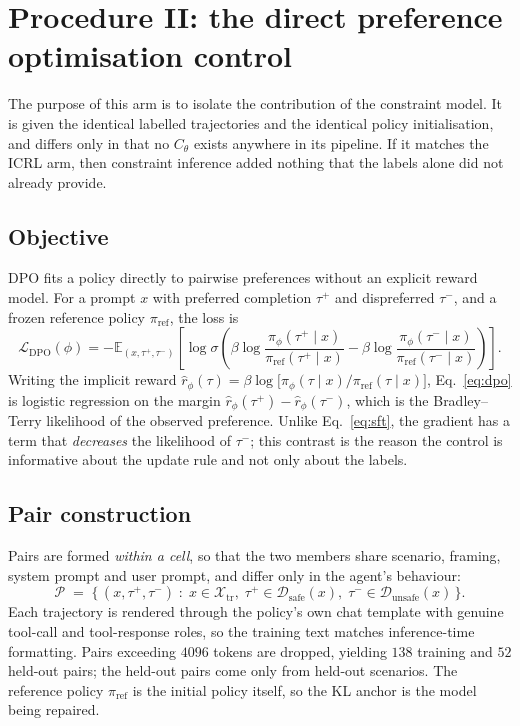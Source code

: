 \documentclass[11pt]{article}
\newcommand{\Cth}{C_{\theta}}
\newcommand{\Ex}{\mathbb{E}}
\begin{document}
\section{Procedure II: the direct preference optimisation control}
\label{sec:dpo}

The purpose of this arm is to isolate the contribution of the constraint model. It is
given the identical labelled trajectories and the identical policy initialisation, and
differs only in that no $\Cth$ exists anywhere in its pipeline. If it matches the ICRL
arm, then constraint inference added nothing that the labels alone did not already
provide.

\subsection{Objective}

DPO fits a policy directly to pairwise preferences without an explicit reward model. For
a prompt $x$ with preferred completion $\tau^{+}$ and dispreferred $\tau^{-}$, and a
frozen reference policy $\pi_{\text{ref}}$, the loss is
\begin{equation}
\mathcal{L}_{\text{DPO}}(\phi)
= - \Ex_{(x, \tau^{+}, \tau^{-})} \left[
\log \sigma \left(
\beta \log \frac{\pi_\phi(\tau^{+} \mid x)}{\pi_{\text{ref}}(\tau^{+} \mid x)}
- \beta \log \frac{\pi_\phi(\tau^{-} \mid x)}{\pi_{\text{ref}}(\tau^{-} \mid x)}
\right) \right].
\label{eq:dpo}
\end{equation}
Writing the implicit reward $\hat{r}_\phi(\tau) = \beta \log \big[ \pi_\phi(\tau \mid x) /
\pi_{\text{ref}}(\tau \mid x) \big]$, Eq.~\eqref{eq:dpo} is logistic regression on the
margin $\hat{r}_\phi(\tau^{+}) - \hat{r}_\phi(\tau^{-})$, which is the Bradley--Terry
likelihood of the observed preference. Unlike Eq.~\eqref{eq:sft}, the gradient has a term
that \emph{decreases} the likelihood of $\tau^{-}$; this contrast is the reason the
control is informative about the update rule and not only about the labels.

\subsection{Pair construction}

Pairs are formed \emph{within a cell}, so that the two members share scenario, framing,
system prompt and user prompt, and differ only in the agent's behaviour:
\begin{equation}
\mathcal{P} \;=\; \big\{\, (x, \tau^{+}, \tau^{-}) \;:\;
x \in \mathcal{X}_{\text{tr}}, \;
\tau^{+} \in \mathcal{D}_{\text{safe}}(x), \;
\tau^{-} \in \mathcal{D}_{\text{unsafe}}(x) \,\big\}.
\end{equation}
Each trajectory is rendered through the policy's own chat template with genuine tool-call
and tool-response roles, so the training text matches inference-time formatting. Pairs
exceeding $4096$ tokens are dropped, yielding $138$ training and $52$ held-out pairs; the
held-out pairs come only from held-out scenarios. The reference policy $\pi_{\text{ref}}$
is the initial policy itself, so the KL anchor is the model being repaired.
\end{document}
